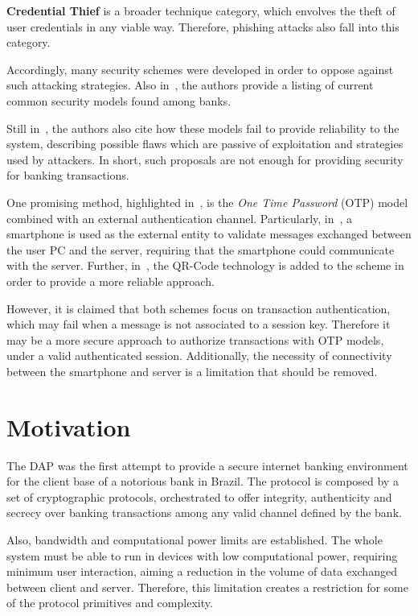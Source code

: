 \textbf{Credential Thief} is a broader technique category, which envolves the theft of user credentials in any viable way. Therefore, phishing attacks also fall into this category.

Accordingly, many security schemes were developed in order to oppose against such attacking strategies. Also in~\cite{Peotta2011, Adham2013}, the authors provide a listing of current common security models found among banks.

Still in~\cite{Peotta2011, Adham2013}, the authors also cite how these models fail to provide reliability to the system, describing possible flaws which are passive of exploitation and strategies used by attackers. In short, such proposals are not enough for providing security for banking transactions.

One promising method, highlighted in~\cite[p.61]{Peotta2012}, is the \textit{One Time Password} (OTP) model combined with an external authentication channel. Particularly, in~\cite{Starnberger2009}, a smartphone is used as the external entity to validate messages exchanged between the user PC and the server, requiring that the smartphone could communicate with the server. Further, in~\cite{LeeHyunLim2010}, the QR-Code technology is added to the scheme in order to provide a more reliable approach.

However, it is claimed that both schemes focus on transaction authentication, which may fail when a message is not associated to a session key. Therefore it may be a more secure approach to authorize transactions with OTP models, under a valid authenticated session. Additionally, the necessity of connectivity between the smartphone and server is a limitation that should be removed.





\section{Motivation}
The DAP was the first attempt to provide a secure internet banking environment for the client base of a notorious bank in Brazil. The protocol is composed by a set of cryptographic protocols, orchestrated to offer integrity, authenticity and secrecy over banking transactions among any valid channel defined by the bank.

Also, bandwidth and computational power limits are established. The whole system must be able to run in devices with low computational power, requiring minimum user interaction, aiming a reduction in the volume of data exchanged between client and server. Therefore, this limitation creates a restriction for some of the protocol primitives and complexity.

